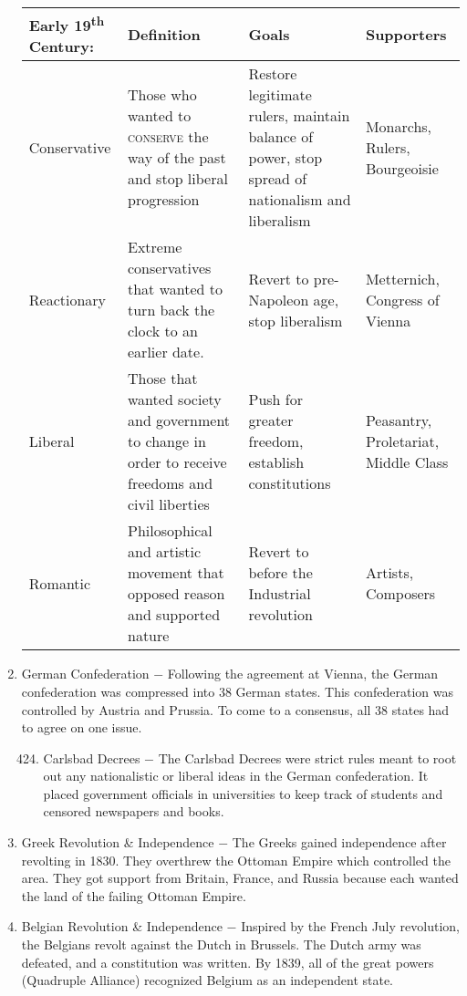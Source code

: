 \documentclass[12pt]{article}
\begin{document}
\begin{enumerate}
\begin{tabular}{p{} p{} p{} p{}}
\hline  
Early 19\textsuperscript{th} Century: & Definition & Goals & Supporters \\
\hline
Conservative & Those who wanted to \textsc{conserve} the way of the past and stop liberal progression & Restore legitimate rulers, maintain balance of power, stop spread of nationalism and liberalism & Monarchs, Rulers, Bourgeoisie  \\
\hline
Reactionary & Extreme conservatives that wanted to turn back the clock to an earlier date. & Revert to pre-Napoleon age, stop liberalism & Metternich, Congress of Vienna  \\
\hline
Liberal & Those that wanted society and government to change in order to receive freedoms and civil liberties  & Push for greater freedom, establish constitutions  & Peasantry, Proletariat, Middle Class  \\
\hline
Romantic & Philosophical and artistic movement that opposed reason and supported nature  & Revert to before the Industrial revolution  & Artists, Composers  \\
\hline

\end{tabular}

\item German Confederation $-$ Following the agreement at Vienna, the German confederation was compressed into 38 German states. This confederation was controlled by Austria and Prussia. To come to a consensus, all 38 states had to agree on one issue.

\begin{enumerate}[label=\arabic{*}.]
\setcounter{enumii}{423}

\item Carlsbad Decrees $-$ The Carlsbad Decrees were strict rules meant to root out any nationalistic or liberal ideas in the German confederation. It placed government officials in universities to keep track of students and censored newspapers and books.

\end{enumerate}
\setcounter{enumi}{424}

\item Greek Revolution \& Independence $-$ The Greeks gained independence after revolting in 1830. They overthrew the Ottoman Empire which controlled the area. They got support from Britain, France, and Russia because each wanted the land of the failing Ottoman Empire.

\item Belgian Revolution \& Independence $-$ Inspired by the French July revolution, the Belgians revolt against the Dutch in Brussels. The Dutch army was defeated, and a constitution was written. By 1839, all of the great powers (Quadruple Alliance) recognized Belgium as an independent state.


\end{enumerate}
\end{document}
